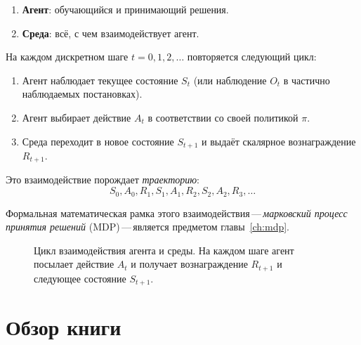 \begin{enumerate}
\item \textbf{Агент}: обучающийся и принимающий решения.
\item \textbf{Среда}: всё, с чем взаимодействует агент.
\end{enumerate}

На каждом дискретном шаге $t=0,1,2,\dots$ повторяется следующий цикл:
\begin{enumerate}
\item Агент наблюдает текущее состояние $S_t$ (или наблюдение $O_t$ в частично наблюдаемых постановках).
\item Агент выбирает действие $A_t$ в соответствии со своей политикой $\pi$.
\item Среда переходит в новое состояние $S_{t+1}$ и выдаёт скалярное вознаграждение $R_{t+1}$.
\end{enumerate}

Это взаимодействие порождает \emph{траекторию}:
\begin{equation}
\label{eq:trajectory}
S_0, A_0, R_1, S_1, A_1, R_2, S_2, A_2, R_3, \dots
\end{equation}

Формальная математическая рамка этого взаимодействия\,---\,\emph{марковский процесс принятия решений} (MDP)\,---\,является предметом главы~\ref{ch:mdp}.

\begin{figure}[ht]
\centering
{}
\caption{Цикл взаимодействия агента и среды.  На каждом шаге агент посылает действие $A_t$ и получает вознаграждение $R_{t+1}$ и следующее состояние $S_{t+1}$.}
\label{fig:agent-env}
\end{figure}


\section{Обзор книги}
\label{sec:book-overview}

